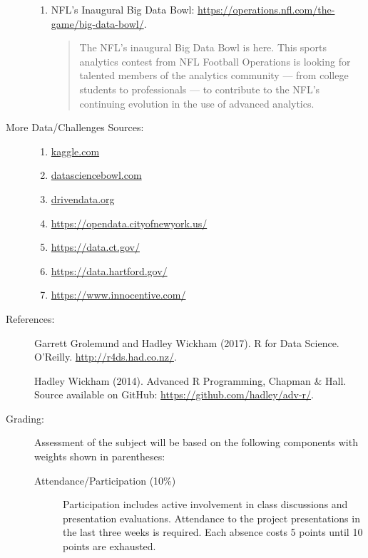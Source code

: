\documentclass[twocolumn, 11pt]{article}
\begin{document}
\begin{description}
\begin{enumerate}
  \item
    NFL's Inaugural Big Data Bowl:
    \url{https://operations.nfl.com/the-game/big-data-bowl/}.
    \begin{quote}
      The NFL’s inaugural Big Data Bowl is here. This sports analytics contest from NFL Football Operations is looking for talented members of the analytics community — from college students to professionals — to contribute to the NFL’s continuing evolution in the use of advanced analytics.
    \end{quote}
    
  \end{enumerate}

  \item[More Data/Challenges Sources:] \hspace{0pt}
  \begin{enumerate}
  \item \url{kaggle.com}
  \item \url{datasciencebowl.com}
  \item \url{drivendata.org}
  \item \url{https://opendata.cityofnewyork.us/}
  \item \url{https://data.ct.gov/}
  \item \url{https://data.hartford.gov/}
  \item \url{https://www.innocentive.com/}
  \end{enumerate}

\item[References:] \hspace{0pt} %

Garrett Grolemund and Hadley Wickham (2017).  R for Data Science. O'Reilly.
\url{http://r4ds.had.co.nz/}.

Hadley Wickham (2014). Advanced R Programming, Chapman \& Hall. Source available on GitHub: \url{https://github.com/hadley/adv-r/}.

\item[Grading:] Assessment of the subject will be based on
the following components with weights shown in parentheses:

\begin{description}
\item[Attendance/Participation (10\%)]
Participation includes active involvement in class discussions and presentation evaluations.
Attendance to the project presentations in the last three weeks is required.
Each absence costs 5 points until 10 points are exhausted.


\end{description}
\end{description}
\end{document}
